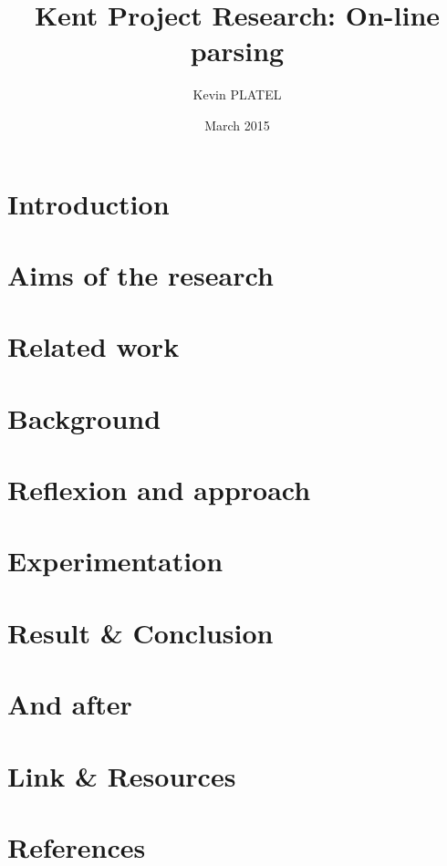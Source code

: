\documentclass[11pt]{article}
\title{Kent Project Research: On-line parsing}
\author{Kevin PLATEL}
\date{March 2015}
\begin{document}
\maketitle

\renewcommand{\contentsname}{Abstract}

\renewcommand{\contentsname}{Table of contents}
\tableofcontents

\newpage{}

\section{Introduction}


\section{Aims of the research}

\section{Related work}

\section{Background}


\section{Reflexion and approach}

\section{Experimentation}

\section{Result \& Conclusion}

\section{And after}

\section{Link \& Resources}


\section{References}
\nocite{*}
 
\printbibliography
\end{document}

